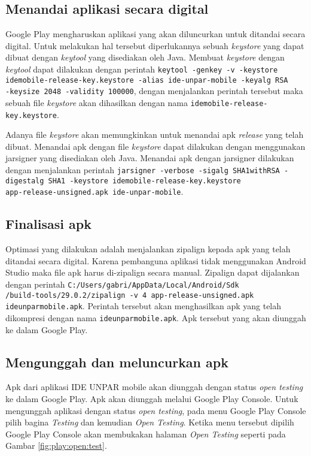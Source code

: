 \subsection{Menandai aplikasi secara digital}
Google Play mengharuskan aplikasi yang akan diluncurkan untuk ditandai secara digital. Untuk melakukan hal tersebut diperlukannya sebuah \textit{keystore} yang dapat dibuat dengan \textit{keytool} yang disediakan oleh Java. Membuat \textit{keystore} dengan \textit{keytool} dapat dilakukan dengan perintah \texttt{keytool -genkey -v -keystore idemobile-release-key.keystore -alias ide-unpar-mobile -keyalg RSA \\ -keysize 2048 -validity 100000}, dengan menjalankan perintah tersebut maka sebuah file \textit{keystore} akan dihasilkan dengan nama \texttt{idemobile-release-key.keystore}.

Adanya file \textit{keystore} akan memungkinkan untuk menandai apk \textit{release} yang telah dibuat. Menandai apk dengan file \textit{keystore} dapat dilakukan dengan menggunakan jarsigner yang disediakan oleh Java. Menandai apk dengan jarsigner dilakukan dengan menjalankan perintah \texttt{jarsigner -verbose -sigalg SHA1withRSA -digestalg SHA1 -keystore idemobile-release-key.keystore \\ app-release-unsigned.apk ide-unpar-mobile}. 

\subsection{Finalisasi apk}
Optimasi yang dilakukan adalah menjalankan zipalign kepada apk yang telah ditandai secara digital. Karena pembanguna aplikasi tidak menggunakan Android Studio maka file apk harus di-zipalign secara manual. Zipalign dapat dijalankan dengan perintah \texttt{C:/Users/gabri/AppData/Local/Android/Sdk\\/build-tools/29.0.2/zipalign -v 4 app-release-unsigned.apk ideunparmobile.apk}. Perintah tersebut akan menghasilkan apk yang telah dikompresi dengan nama \texttt{ideunparmobile.apk}. Apk tersebut yang akan diunggah ke dalam Google Play.

\subsection{Mengunggah dan meluncurkan apk}
Apk dari aplikasi IDE UNPAR mobile akan diunggah dengan status \textit{open testing} ke dalam Google Play. Apk akan diunggah melalui Google Play Console. Untuk mengunggah aplikasi dengan status \textit{open testing}, pada menu Google Play Console pilih bagina \textit{Testing} dan kemudian \textit{Open Testing}. Ketika menu tersebut dipilih Google Play Console akan membukakan halaman \textit{Open Testing} seperti pada Gambar \ref{fig:play:open:test}. 

